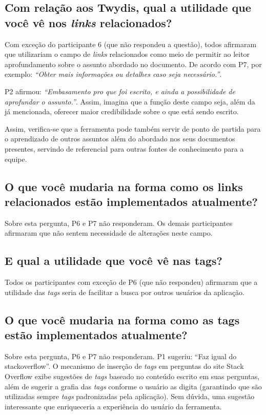 \subsection{Com relação aos Twydis, qual a utilidade que você vê nos \textit{links} relacionados?}

Com exceção do participante 6 (que não respondeu a questão), todos afirmaram que utilizariam o campo de \textit{links} relacionados como meio de permitir ao leitor aprofundamento sobre o assunto abordado no documento. De acordo com P7, por exemplo: \textit{``Obter mais informações ou detalhes caso seja necessário.''}.

P2 afirmou: \textit{``Embasamento pro que foi escrito, e ainda a possibilidade de aprofundar o assunto.''}. Assim, imagina que a função deste campo seja, além da já mencionada, oferecer maior credibilidade sobre o que está sendo escrito.

Assim, verifica-se que a ferramenta pode também servir de ponto de partida para o aprendizado de outros assuntos além do abordado nos seus documentos presentes, servindo de referencial para outras fontes de conhecimento para a equipe.

\subsection{O que você mudaria na forma como os links relacionados estão implementados atualmente?}

Sobre esta pergunta, P6 e P7 não responderam. Os demais participantes afirmaram que não sentem necessidade de alterações neste campo.

\subsection{E qual a utilidade que você vê nas tags?}

Todos os participantes com exceção de P6 (que não respondeu) afirmaram que a utilidade das \textit{tags} seria de facilitar a busca por outros usuários da aplicação.

\subsection{O que você mudaria na forma como as tags estão implementados atualmente?}

Sobre esta pergunta, P6 e P7 não responderam. P1 sugeriu: ``Faz igual do stackoverflow''. O mecanismo de inserção de \textit{tags} em perguntas do site Stack Overflow exibe sugestões de \textit{tags} baseado no conteúdo escrito em suas perguntas, além de sugerir a grafia das \textit{tags} conforme o usuário as digita (garantindo que são utilizadas sempre \textit{tags} padronizadas pela aplicação). Sem dúvida, uma sugestão interessante que enriqueceria a experiência do usuário da ferramenta.


